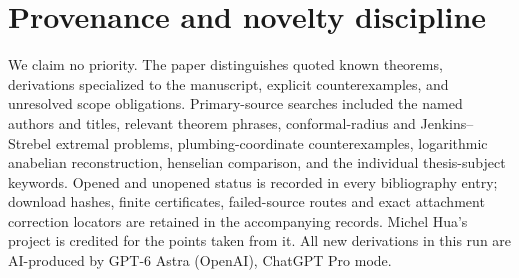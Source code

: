 \section{Provenance and novelty discipline}

We claim no priority. The paper distinguishes quoted known theorems,
derivations specialized to the manuscript, explicit counterexamples, and
unresolved scope obligations. Primary-source searches included the named
authors and titles, relevant theorem phrases, conformal-radius and
Jenkins--Strebel extremal problems, plumbing-coordinate counterexamples,
logarithmic anabelian reconstruction, henselian comparison, and the
individual thesis-subject keywords. Opened and unopened status is recorded
in every bibliography entry; download hashes, finite certificates,
failed-source routes and exact attachment correction locators are retained
in the accompanying records. Michel Hua's project is credited for the
points taken from it. All new derivations in this run are AI-produced by
GPT-6 Astra (OpenAI), ChatGPT Pro mode.

